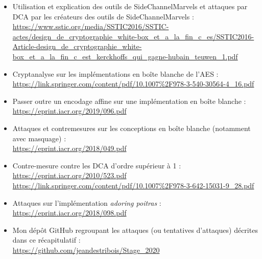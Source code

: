 \documentclass[10pt,a4paper]{article}
\begin{document}
\begin{itemize}
\item Utilisation et explication des outils de SideChannelMarvels et attaques par DCA par les créateurs des outils de SideChannelMarvels :\\
\url{https://www.sstic.org/media/SSTIC2016/SSTIC-actes/design_de_cryptographie_white-box_et_a_la_fin_c_es/SSTIC2016-Article-design_de_cryptographie_white-box_et_a_la_fin_c_est_kerckhoffs_qui_gagne-hubain_teuwen_1.pdf}\\

\item Cryptanalyse sur les implémentations en boîte blanche de l'AES :\\
\url{https://link.springer.com/content/pdf/10.1007\%2F978-3-540-30564-4_16.pdf}\\

\item Passer outre un encodage affine sur une implémentation en boîte blanche :\\
\url{https://eprint.iacr.org/2019/096.pdf}\\

\item Attaques et contremesures sur les conceptions en boîte blanche (notamment avec masquage) :\\
\url{https://eprint.iacr.org/2018/049.pdf}\\

\item Contre-mesure contre les DCA d'ordre supérieur à 1 :\\
\url{https://eprint.iacr.org/2010/523.pdf}\\
\url{https://link.springer.com/content/pdf/10.1007\%2F978-3-642-15031-9_28.pdf}\\

\item Attaques sur l'implémentation \textit{adoring poitras} :\\
\url{https://eprint.iacr.org/2018/098.pdf}\\

\item Mon dépôt GitHub regroupant les attaques (ou tentatives d'attaques) décrites dans ce récapitulatif :\\
\url{https://github.com/jeandestribois/Stage_2020}\\
\end{itemize}
\end{document}
